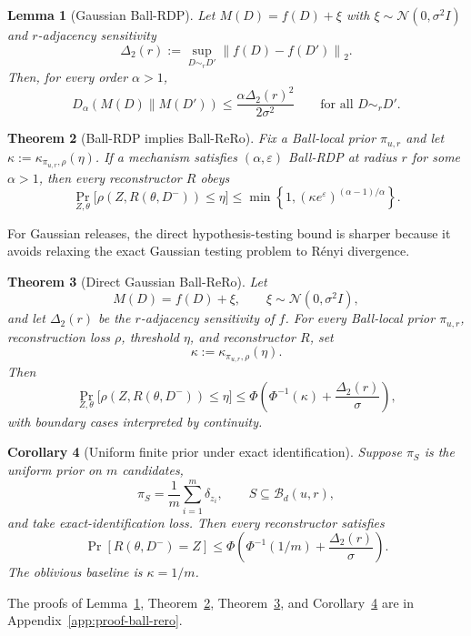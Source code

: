 \documentclass[11pt,a4paper]{report}
\theoremstyle{plain}
\newtheorem{theorem}{Theorem}[chapter]
\newtheorem{lemma}[theorem]{Lemma}
\newtheorem{corollary}[theorem]{Corollary}
\theoremstyle{definition}
\theoremstyle{remark}
\newcommand{\N}{\mathcal{N}}
\newcommand{\Ball}{\mathcal{B}}
\newcommand{\norm}[1]{\left\lVert #1\right\rVert}
\begin{document}
\begin{lemma}[Gaussian Ball-RDP]
\label{lem:gaussian-ball-rdp}
Let $M(D)=f(D)+\xi$ with $\xi\sim\N(0,\sigma^2I)$ and $r$-adjacency sensitivity
\[
\Delta_2(r):=\sup_{D\sim_rD'}\norm{f(D)-f(D')}_2.
\]
Then, for every order $\alpha>1$,
\[
D_\alpha(M(D)\|M(D'))
\le
\frac{\alpha\Delta_2(r)^2}{2\sigma^2}
\qquad\text{for all }D\sim_rD'.
\]
\end{lemma}

\begin{theorem}[Ball-RDP implies Ball-ReRo]
\label{thm:ball-rdp-rero}
Fix a Ball-local prior $\pi_{u,r}$ and let $\kappa:=\kappa_{\pi_{u,r},\rho}(\eta)$.  If a mechanism satisfies $(\alpha,\varepsilon)$ Ball-RDP at radius $r$ for some $\alpha>1$, then every reconstructor $R$ obeys
\[
\Pr_{Z,\theta}\big[\rho(Z,R(\theta,D^-))\le\eta\big]
\le
\min\left\{1,(\kappa e^\varepsilon)^{(\alpha-1)/\alpha}\right\}.
\]
\end{theorem}

For Gaussian releases, the direct hypothesis-testing bound is sharper because it avoids relaxing the exact Gaussian testing problem to R\'enyi divergence.

\begin{theorem}[Direct Gaussian Ball-ReRo]
\label{thm:direct-gaussian-rero}
Let
\[
M(D)=f(D)+\xi,
\qquad
\xi\sim\N(0,\sigma^2I),
\]
and let $\Delta_2(r)$ be the $r$-adjacency sensitivity of $f$.  For every Ball-local prior $\pi_{u,r}$, reconstruction loss $\rho$, threshold $\eta$, and reconstructor $R$, set
\[
\kappa:=\kappa_{\pi_{u,r},\rho}(\eta).
\]
Then
\[
\Pr_{Z,\theta}\big[\rho(Z,R(\theta,D^-))\le\eta\big]
\le
\Phi\left(\Phi^{-1}(\kappa)+\frac{\Delta_2(r)}{\sigma}\right),
\]
with boundary cases interpreted by continuity.
\end{theorem}

\begin{corollary}[Uniform finite prior under exact identification]
\label{cor:uniform-finite-prior}
Suppose $\pi_S$ is the uniform prior on $m$ candidates,
\[
\pi_S=\frac1m\sum_{i=1}^m\delta_{z_i},
\qquad
S\subseteq\Ball_d(u,r),
\]
and take exact-identification loss.  Then every reconstructor satisfies
\[
\Pr[R(\theta,D^-)=Z]
\le
\Phi\left(\Phi^{-1}(1/m)+\frac{\Delta_2(r)}{\sigma}\right).
\]
The oblivious baseline is $\kappa=1/m$.
\end{corollary}

The proofs of Lemma~\ref{lem:gaussian-ball-rdp}, Theorem~\ref{thm:ball-rdp-rero}, Theorem~\ref{thm:direct-gaussian-rero}, and Corollary~\ref{cor:uniform-finite-prior} are in Appendix~\ref{app:proof-ball-rero}.
\end{document}
